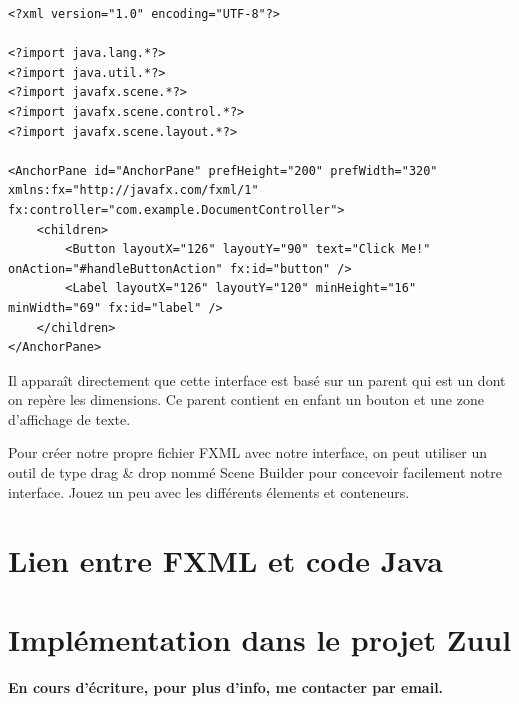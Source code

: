 \begin{appendix}
\begin{codeblock}
\begin{verbatim}
<?xml version="1.0" encoding="UTF-8"?>

<?import java.lang.*?>
<?import java.util.*?>
<?import javafx.scene.*?>
<?import javafx.scene.control.*?>
<?import javafx.scene.layout.*?>

<AnchorPane id="AnchorPane" prefHeight="200" prefWidth="320" xmlns:fx="http://javafx.com/fxml/1" fx:controller="com.example.DocumentController">
    <children>
        <Button layoutX="126" layoutY="90" text="Click Me!" onAction="#handleButtonAction" fx:id="button" />
        <Label layoutX="126" layoutY="120" minHeight="16" minWidth="69" fx:id="label" />
    </children>
</AnchorPane>
\end{verbatim}
\end{codeblock}

Il apparaît directement que cette interface est basé sur un parent qui est un  dont on repère les dimensions. Ce parent contient en enfant un bouton et une zone d'affichage de texte.

Pour créer notre propre fichier FXML avec notre interface, on peut utiliser un outil de type drag \& drop nommé Scene Builder pour concevoir facilement notre interface. Jouez un peu avec les différents élements et conteneurs.

\section{Lien entre FXML et code Java}

\section{Implémentation dans le projet Zuul}

\textbf{En cours d'écriture, pour plus d'info, me contacter par email.}

\end{appendix}

